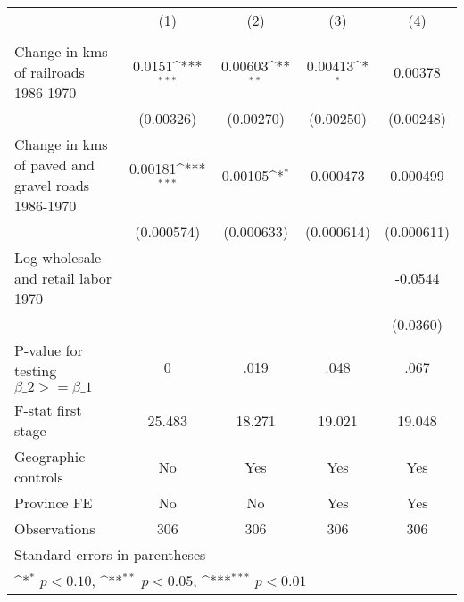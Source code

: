 {
\def\sym#1{\ifmmode^{#1}\else\(^{#1}\)\fi}
\begin{tabular}{l*{4}{c}}
\hline\hline
                &\multicolumn{1}{c}{(1)}&\multicolumn{1}{c}{(2)}&\multicolumn{1}{c}{(3)}&\multicolumn{1}{c}{(4)}\\
                &\multicolumn{1}{c}{}&\multicolumn{1}{c}{}&\multicolumn{1}{c}{}&\multicolumn{1}{c}{}\\
\hline
Change in kms of railroads 1986-1970&   0.0151\sym{***}&  0.00603\sym{**} &  0.00413\sym{*}  &  0.00378         \\
                &(0.00326)         &(0.00270)         &(0.00250)         &(0.00248)         \\
[1em]
Change in kms of paved and gravel roads 1986-1970&  0.00181\sym{***}&  0.00105\sym{*}  & 0.000473         & 0.000499         \\
                &(0.000574)         &(0.000633)         &(0.000614)         &(0.000611)         \\
[1em]
Log wholesale and retail labor 1970&                  &                  &                  &  -0.0544         \\
                &                  &                  &                  & (0.0360)         \\
\hline
P-value for testing $\beta\_{2} >= \beta\_{1}$&        0         &     .019         &     .048         &     .067         \\
F-stat first stage&   25.483         &   18.271         &   19.021         &   19.048         \\
Geographic controls&       No         &      Yes         &      Yes         &      Yes         \\
Province FE     &       No         &       No         &      Yes         &      Yes         \\
Observations    &      306         &      306         &      306         &      306         \\
\hline\hline
\multicolumn{5}{l}{\footnotesize Standard errors in parentheses}\\
\multicolumn{5}{l}{\footnotesize \sym{*} \(p<0.10\), \sym{**} \(p<0.05\), \sym{***} \(p<0.01\)}\\
\end{tabular}
}
